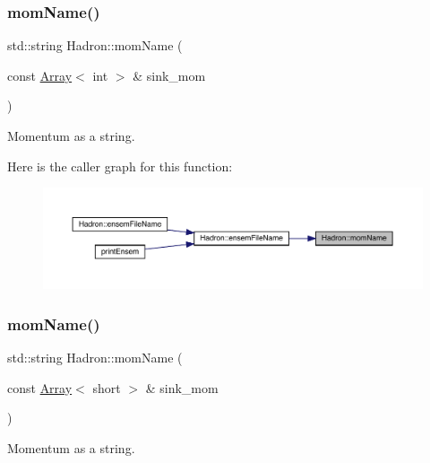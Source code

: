 \subsubsection{\texorpdfstring{momName()}{momName()}\hspace{0.1cm}{\footnotesize\ttfamily [1/2]}}
{\footnotesize\ttfamily std\+::string Hadron\+::mom\+Name (\begin{DoxyParamCaption}\item[{const \mbox{\hyperlink{classXMLArray_1_1Array}{Array}}$<$ int $>$ \&}]{sink\+\_\+mom }\end{DoxyParamCaption})}



Momentum as a string. 

Here is the caller graph for this function\+:\nopagebreak
\begin{figure}[H]
\begin{center}
\leavevmode
\includegraphics[width=350pt]{d1/daf/namespaceHadron_ad1ac646aa2d410cc55e4b11c925867a6_icgraph}
\end{center}
\end{figure}
\mbox{\label{namespaceHadron_aaac56034a899893bfbd130cdd0427018}} 
\subsubsection{\texorpdfstring{momName()}{momName()}\hspace{0.1cm}{\footnotesize\ttfamily [2/2]}}
{\footnotesize\ttfamily std\+::string Hadron\+::mom\+Name (\begin{DoxyParamCaption}\item[{const \mbox{\hyperlink{classXMLArray_1_1Array}{Array}}$<$ short $>$ \&}]{sink\+\_\+mom }\end{DoxyParamCaption})}



Momentum as a string. 

\mbox{\label{namespaceHadron_afc213211f9c79372b449aac381596d1c}} 
